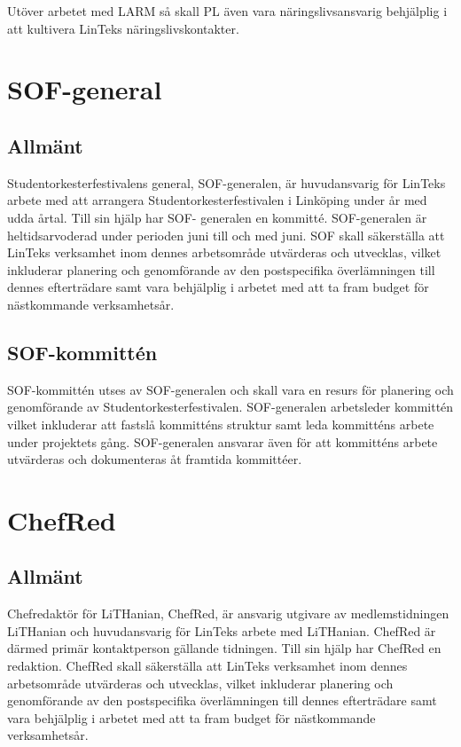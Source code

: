 Utöver arbetet med LARM så skall PL även vara näringslivsansvarig
behjälplig i att kultivera LinTeks näringslivskontakter.

\hypertarget{sof-general}{%
\section{SOF-general}\label{sof-general}}

\hypertarget{allmuxe4nt-7}{%
\subsection{Allmänt}\label{allmuxe4nt-7}}

Studentorkesterfestivalens general, SOF-generalen, är huvudansvarig för
LinTeks arbete med att arrangera Studentorkesterfestivalen i Linköping
under år med udda årtal. Till sin hjälp har SOF- generalen en kommitté.
SOF-generalen är heltidsarvoderad under perioden juni till och med juni.
SOF skall säkerställa att LinTeks verksamhet inom dennes arbetsområde
utvärderas och utvecklas, vilket inkluderar planering och genomförande
av den postspecifika överlämningen till dennes efterträdare samt vara
behjälplig i arbetet med att ta fram budget för nästkommande
verksamhetsår.

\hypertarget{sof-kommittuxe9n}{%
\subsection{SOF-kommittén}\label{sof-kommittuxe9n}}

SOF-kommittén utses av SOF-generalen och skall vara en resurs för
planering och genomförande av Studentorkesterfestivalen. SOF-generalen
arbetsleder kommittén vilket inkluderar att fastslå kommitténs struktur
samt leda kommitténs arbete under projektets gång. SOF-generalen
ansvarar även för att kommitténs arbete utvärderas och dokumenteras åt
framtida kommittéer.

\hypertarget{chefred}{%
\section{ChefRed}\label{chefred}}

\hypertarget{allmuxe4nt-8}{%
\subsection{Allmänt}\label{allmuxe4nt-8}}

Chefredaktör för LiTHanian, ChefRed, är ansvarig utgivare av
medlemstidningen LiTHanian och huvudansvarig för LinTeks arbete med
LiTHanian. ChefRed är därmed primär kontaktperson gällande tidningen.
Till sin hjälp har ChefRed en redaktion. ChefRed skall säkerställa att
LinTeks verksamhet inom dennes arbetsområde utvärderas och utvecklas,
vilket inkluderar planering och genomförande av den postspecifika
överlämningen till dennes efterträdare samt vara behjälplig i arbetet
med att ta fram budget för nästkommande verksamhetsår.

